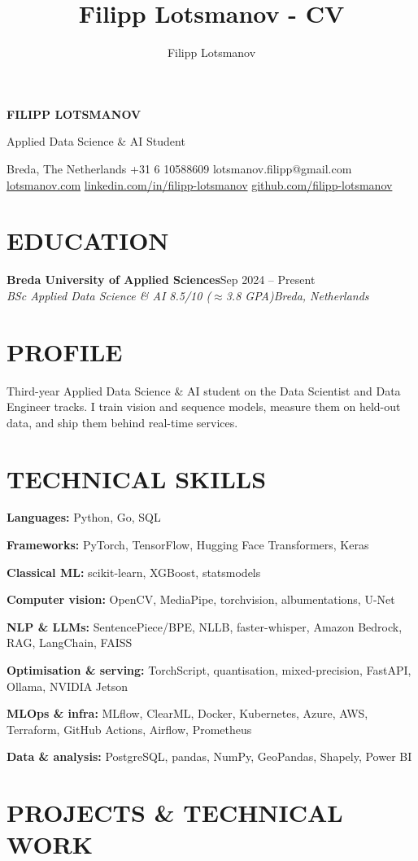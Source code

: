\documentclass[10pt,a4paper]{article}
\author{Filipp Lotsmanov}
\title{Filipp Lotsmanov - CV}
\newcommand{\sep}{\hspace{5pt}\textperiodcentered\hspace{5pt}}
\newcommand{\entry}[4]{%
  \textbf{#1}\hfill #2\\
  \textit{#3}\hfill \textit{#4}\par\vspace{1pt}}
\newcommand{\skillrow}[2]{\textbf{#1:} #2\par}
\begin{document}
{\LARGE\bfseries FILIPP LOTSMANOV}\par\vspace{2pt}
Applied Data Science \& AI Student\par\vspace{3pt}
Breda, The Netherlands \sep +31 6 10588609 \sep lotsmanov.filipp@gmail.com\\
\href{https://lotsmanov.com}{lotsmanov.com} \sep \href{https://linkedin.com/in/filipp-lotsmanov}{linkedin.com/in/filipp-lotsmanov} \sep \href{https://github.com/filipp-lotsmanov}{github.com/filipp-lotsmanov}
\par\vspace{3pt}

\section*{EDUCATION}
\entry{Breda University of Applied Sciences}{Sep 2024 -- Present}
      {BSc Applied Data Science \& AI \sep 8.5/10 ($\approx$3.8 GPA)}
      {Breda, Netherlands}

\section*{PROFILE}
Third-year Applied Data Science \& AI student on the Data Scientist and Data
Engineer tracks. I train vision and sequence models, measure them on held-out
data, and ship them behind real-time services.

\section*{TECHNICAL SKILLS}
\skillrow{Languages}{Python, Go, SQL}
\skillrow{Frameworks}{PyTorch, TensorFlow, Hugging Face Transformers, Keras}
\skillrow{Classical ML}{scikit-learn, XGBoost, statsmodels}
\skillrow{Computer vision}{OpenCV, MediaPipe, torchvision, albumentations, U-Net}
\skillrow{NLP \& LLMs}{SentencePiece/BPE, NLLB, faster-whisper, Amazon Bedrock, RAG, LangChain, FAISS}
\skillrow{Optimisation \& serving}{TorchScript, quantisation, mixed-precision, FastAPI, Ollama, NVIDIA Jetson}
\skillrow{MLOps \& infra}{MLflow, ClearML, Docker, Kubernetes, Azure, AWS, Terraform, GitHub Actions, Airflow, Prometheus}
\skillrow{Data \& analysis}{PostgreSQL, pandas, NumPy, GeoPandas, Shapely, Power BI}

\section*{PROJECTS \& TECHNICAL WORK}
\end{document}
